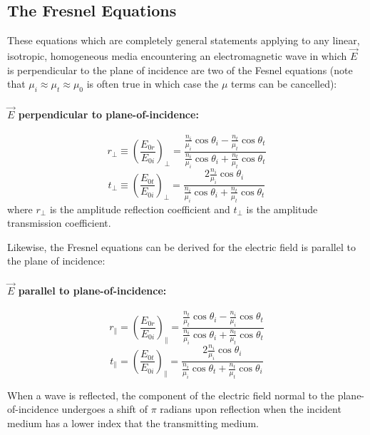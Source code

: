 \documentclass[12pt]{report}
\begin{document}
\subsection{The Fresnel Equations}
These equations which are completely general statements applying to any linear, isotropic, homogeneous media encountering an electromagnetic wave in which $\vec{E}$ is perpendicular to the plane of incidence are two of the Fesnel equations (note that $\mu_i \approx \mu_t \approx \mu_0$ is often true in which case the $\mu$ terms can be cancelled):
\paragraph{$\vec{E}$ perpendicular to plane-of-incidence:}
\begin{equation}
r_\perp \equiv \left(\frac{E_{0r}}{E_{0i}}\right)_\perp = \frac{\frac{n_i}{\mu_i}\cos \theta_i-\frac{n_t}{\mu_t}\cos \theta_t}{\frac{n_i}{\mu_i}\cos \theta_i+\frac{n_t}{\mu_t}\cos \theta_t}
\end{equation}
\begin{equation}
t_\perp \equiv \left(\frac{E_{0t}}{E_{0i}}\right)_\perp = \frac{2 \frac{n_i}{\mu_i}\cos \theta_i}{\frac{n_i}{\mu_i}\cos \theta_i+\frac{n_t}{\mu_t}\cos \theta_t}
\end{equation}
where $r_\perp$ is the amplitude reflection coefficient and $t_\perp$ is the amplitude transmission coefficient.

Likewise, the Fresnel equations can be derived for the electric field is parallel to the plane of incidence:
\paragraph{$\vec{E}$ parallel to plane-of-incidence:}
\begin{equation}
r_\parallel = \left(\frac{E_{0r}}{E_{0i}}\right)_\parallel = \frac{\frac{n_t}{\mu_t}\cos \theta_i-\frac{n_i}{\mu_i}\cos \theta_t}{\frac{n_i}{\mu_i}\cos \theta_i+\frac{n_t}{\mu_t}\cos \theta_t}
\end{equation}
\begin{equation}
t_\parallel = \left(\frac{E_{0t}}{E_{0i}}\right)_\parallel = \frac{2 \frac{n_i}{\mu_i}\cos \theta_i}{\frac{n_i}{\mu_i}\cos \theta_t+\frac{n_t}{\mu_t}\cos \theta_i}
\end{equation}

When a wave is reflected, the component of the electric field normal to the plane-of-incidence undergoes a shift of $\pi$ radians upon reflection when the incident medium has a lower index that the transmitting medium. 
\end{document}
